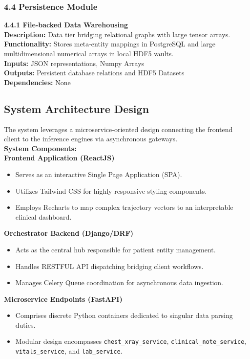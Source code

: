 \documentclass{fisatprojectfinal}
\begin{document}
\subsubsection{4.4 Persistence Module}
\textbf{4.4.1 File-backed Data Warehousing} \\
\textbf{Description:} Data tier bridging relational graphs with large tensor arrays. \\
\textbf{Functionality:} Stores meta-entity mappings in PostgreSQL and large multidimensional numerical arrays in local HDF5 vaults. \\
\textbf{Inputs:} JSON representations, Numpy Arrays \\
\textbf{Outputs:} Persistent database relations and HDF5 Datasets \\
\textbf{Dependencies:} None

\subsection{System Architecture Design}
The system leverages a microservice-oriented design connecting the frontend client to the inference engines via asynchronous gateways. \\
\textbf{System Components:} \\

\textbf{Frontend Application (ReactJS)}
\begin{itemize}
    \item Serves as an interactive Single Page Application (SPA).
    \item Utilizes Tailwind CSS for highly responsive styling components.
    \item Employs Recharts to map complex trajectory vectors to an interpretable clinical dashboard.
\end{itemize}

\textbf{Orchestrator Backend (Django/DRF)}
\begin{itemize}
    \item Acts as the central hub responsible for patient entity management.
    \item Handles RESTFUL API dispatching bridging client workflows.
    \item Manages Celery Queue coordination for asynchronous data ingestion.
\end{itemize}

\textbf{Microservice Endpoints (FastAPI)}
\begin{itemize}
    \item Comprises discrete Python containers dedicated to singular data parsing duties.
    \item Modular design encompasses \texttt{chest\_xray\_service}, \texttt{clinical\_note\_service}, \texttt{vitals\_service}, and \texttt{lab\_service}.
\end{itemize}
\end{document}
